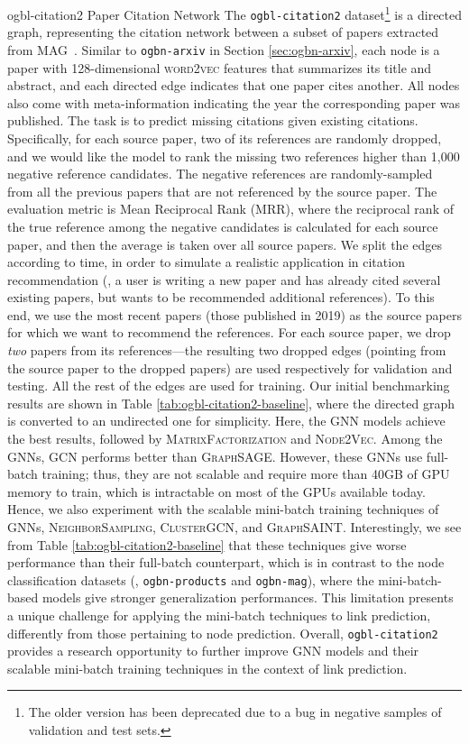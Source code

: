 \dataset
{ogbl-citation2}
{Paper Citation Network}
{The \texttt{ogbl-citation2} dataset\footnote{The older version  has been deprecated due to a bug in negative samples of validation and test sets.} is a directed graph, representing the citation network between a subset of papers extracted from MAG~\citep{wang2020mag}. 
Similar to \texttt{ogbn-arxiv} in Section \ref{sec:ogbn-arxiv}, each node is a paper with 128-dimensional \textsc{word2vec} features that summarizes its title and abstract, and each directed edge indicates that one paper cites another. All nodes also come with meta-information indicating the year the corresponding paper was published. 
}
{The task is to predict missing citations given existing citations. Specifically, 
for each source paper, 
two of its references are randomly dropped, and we would like the model to rank the missing two references higher than 1,000 negative reference candidates.
The negative references are randomly-sampled from all the previous papers that are not referenced by the source paper. 
The evaluation metric is Mean Reciprocal Rank (MRR), where the reciprocal rank of the true reference among the negative candidates is calculated for each source paper, and then the average is taken over 
all source papers. 
}
{We split the edges according to time, in order to simulate a realistic application in citation recommendation (\eg, a user is writing a new paper and has already cited several existing papers, but wants to be recommended additional references). To this end, we use the most recent papers (those published in 2019) as the source papers for which we want to recommend the references. For each source paper, we drop \emph{two} papers from its references---the resulting two dropped edges (pointing from the source paper to the dropped papers) are used respectively for validation and testing. 
All the rest of the edges are used for training.
}
{Our initial benchmarking results are shown in Table \ref{tab:ogbl-citation2-baseline}, where the directed graph is converted to an undirected one for simplicity. 
Here, the GNN models achieve the best results, followed by \textsc{MatrixFactorization} and \textsc{Node2Vec}.
Among the GNNs, \textsc{GCN} performs better than \textsc{GraphSAGE}.
However, these GNNs use full-batch training; thus, they are not scalable and require more than 40GB of GPU memory to train, which is intractable on most of the GPUs available today.
Hence, we also experiment with the scalable mini-batch training techniques of GNNs, \textsc{NeighborSampling}, \textsc{ClusterGCN}, and \textsc{GraphSAINT}.
Interestingly, we see from Table \ref{tab:ogbl-citation2-baseline} that these techniques give worse performance than their full-batch counterpart, which is in contrast to the node classification datasets (\eg, \texttt{ogbn-products} and \texttt{ogbn-mag}), where the mini-batch-based models give stronger generalization performances.
This limitation presents a unique challenge for applying the mini-batch techniques to link prediction, differently from those pertaining to node prediction.
Overall, \texttt{ogbl-citation2} provides a research opportunity to further improve GNN models and their scalable mini-batch training techniques in the context of link prediction.
}

